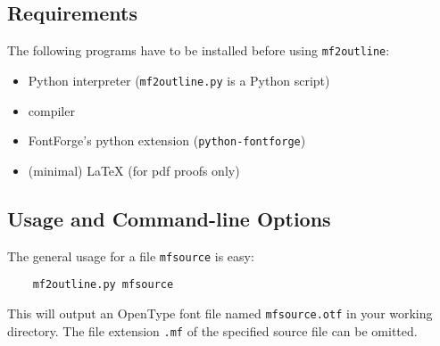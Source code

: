 \documentclass{scrartcl}
\begin{document}
\subsection{Requirements}
%
The following programs have to be installed before using \verb|mf2outline|:
%
\begin{itemize}
	\item Python interpreter (\verb|mf2outline.py| is a Python script)
	\item \MP{} compiler
	\item FontForge's python extension (\verb|python-fontforge|)
	\item (minimal) \LaTeX{} (for pdf proofs only)
\end{itemize}
%
\subsection{Usage and Command-line Options}
%
The general usage for a \MF{} file \verb|mfsource| is easy:
\begin{verbatim}
	mf2outline.py mfsource
\end{verbatim}
%
This will output an OpenType font file named \verb|mfsource.otf| in your working directory. The file extension \verb|.mf| of the specified \MF{} source file can be omitted.
\end{document}
